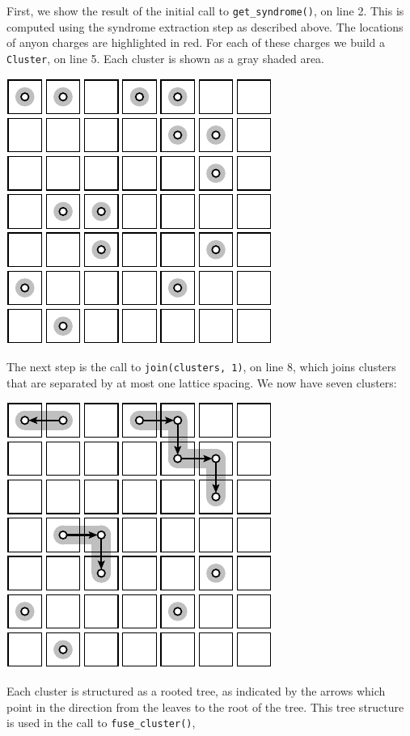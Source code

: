 \documentclass[aps, letterpaper, onecolumn, superscriptaddress, notitlepage, 10pt]{revtex4-1}
\begin{document}
First, we show the result of the initial call to {\tt get\_syndrome()}, on line 2. This is computed using the syndrome extraction step as described above.
The locations of anyon charges are highlighted in red.
For each of these charges we build a {\tt Cluster}, on line 5.
Each cluster is shown as a gray shaded area.
\begin{center}
\includegraphics[]{pic-decode-0.pdf}
\end{center}
The next step is the call to {\tt join(clusters, 1)}, on line 8,
which joins clusters that are separated by at most one lattice
spacing. We now have seven clusters:
\begin{center}
\includegraphics[]{pic-decode-1.pdf}
\end{center}
Each cluster is structured as a rooted tree, as indicated by
the arrows which point in the direction from the leaves to
the root of the tree. 
This tree structure is used in the call to {\tt fuse\_cluster()},
\end{document}
